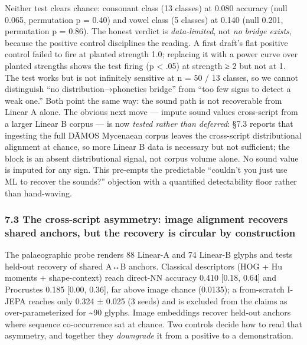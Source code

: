 \documentclass[
  10pt,
]{article}
\begin{document}
Neither test clears chance: consonant class (13 classes) at 0.080
accuracy (null 0.065, permutation p = 0.40) and vowel class (5 classes)
at 0.140 (null 0.201, permutation p = 0.86). The honest verdict is
\emph{data-limited}, not \emph{no bridge exists}, because the positive
control disciplines the reading. A first draft's flat positive control
failed to fire at planted strength 1.0; replacing it with a power curve
over planted strengths shows the test firing (p \textless{} .05) at
strength ≥ 2 but not at 1. The test works but is not infinitely
sensitive at n = 50 / 13 classes, so we cannot distinguish ``no
distribution→phonetics bridge'' from ``too few signs to detect a weak
one.'' Both point the same way: the sound path is not recoverable from
Linear A alone. The obvious next move --- impute sound values
cross-script from a larger Linear B corpus --- is now \emph{tested
rather than deferred}: §7.3 reports that ingesting the full DĀMOS
Mycenaean corpus leaves the cross-script distributional alignment at
chance, so more Linear B data is necessary but not sufficient; the block
is an absent distributional signal, not corpus volume alone. No sound
value is imputed for any sign. This pre-empts the predictable ``couldn't
you just use ML to recover the sounds?'' objection with a quantified
detectability floor rather than hand-waving.

\hypertarget{the-cross-script-asymmetry-image-alignment-recovers-shared-anchors-but-the-recovery-is-circular-by-construction}{%
\subsubsection{7.3 The cross-script asymmetry: image alignment recovers
shared anchors, but the recovery is circular by
construction}\label{the-cross-script-asymmetry-image-alignment-recovers-shared-anchors-but-the-recovery-is-circular-by-construction}}

The palaeographic probe renders 88 Linear-A and 74 Linear-B glyphs and
tests held-out recovery of shared A↔B anchors. Classical descriptors
(HOG + Hu moments + shape-context) reach direct-NN accuracy 0.410
{[}0.18, 0.64{]} and Procrustes 0.185 {[}0.00, 0.36{]}, far above image
chance (0.0135); a from-scratch I-JEPA reaches only 0.324 ± 0.025 (3
seeds) and is excluded from the claims as over-parameterized for
\textasciitilde90 glyphs. Image embeddings recover held-out anchors
where sequence co-occurrence sat at chance. Two controls decide how to
read that asymmetry, and together they \emph{downgrade} it from a
positive to a demonstration.
\end{document}
